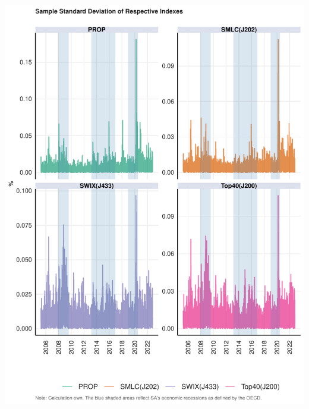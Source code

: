 \documentclass[11pt,preprint, authoryear]{elsarticle}
\let\origfigure\figure
\let\endorigfigure\endfigure
\renewenvironment{figure}[1][2] {
    \expandafter\origfigure\expandafter[H]
} {
    \endorigfigure
}
\numberwithin{equation}{section}
\numberwithin{figure}{section}
\numberwithin{table}{section}
\begin{document}
\begin{figure}[H]

{\centering \includegraphics{19025831_files/figure-latex/aa2-1} 

}

\caption{Sample Standard Deviation \label{aa2}}\label{fig:aa2}
\end{figure}


\end{document}
